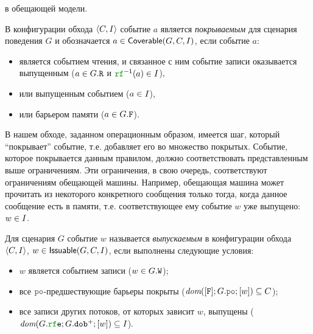 в обещающей модели.
\begin{definition}
В конфигурации обхода ${\langle{C, I}\rangle}$ событие $a$ является \emph{покрываемым} для сценария поведения $G$
и обозначается $a\in {\sf Coverable}(G, C, I)$, если событие $a$:
  \begin{itemize}
    \item является событием чтения, и связанное с ним событие записи оказывается выпущенным ($a \in G.{\mathtt{R}}$ и $\lRF^{-1}(a) \in \IssuedSet$),
    \item или выпущенным событием ($a \in I$),
    \item или барьером памяти ($a \in G.{\mathtt{F}}$).
  \end{itemize}
\end{definition}
В нашем обходе, заданном операционным образом, имеется шаг, который ``покрывает'' событие, т.е. добавляет
его во множество покрытых. Событие, которое покрывается данным правилом, должно соответствовать представленным выше ограничениям.
Эти ограничения, в свою очередь,  соответствуют ограничениям обещающей машины. Например, обещающая машина может 
прочитать из некоторого конкретного сообщения только тогда, когда данное сообщение есть в памяти,
т.е. соответствующее ему событие $w$ уже выпущено: $w \in I$.
\begin{definition}
Для сценария $G$ событие $w$ называется \emph{выпускаемым}
в конфигурации обхода ${\langle{C, I}\rangle}$,
$w\in{\sf Issuable}(G, C, I)$, если выполнены следующие условия:
      \begin{itemize}
        \item $w$ является событием записи ($w\in G.{\mathtt{W}}$);
        \item все $\lPO$-предшествующие барьеры покрыты
          ($\dom{[\lF];G.\lPO;[w]} \suq C$);
        \item все записи других потоков, от которых зависит $w$, выпущены
          ($\dom{G.\lRFE;G.\lDOB^{+};[w]} \suq \IssuedSet$).
      \end{itemize}
\end{definition}
